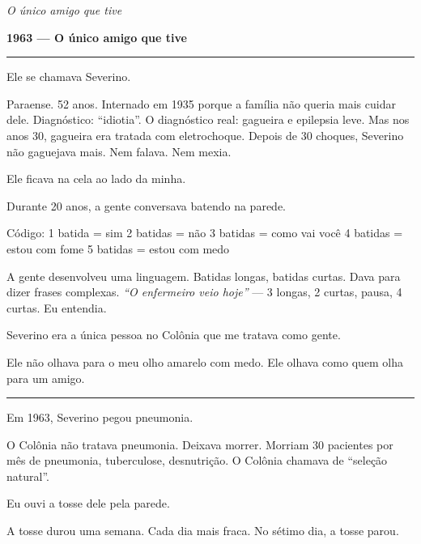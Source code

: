 
\noindent \textit{O único amigo que tive}

\noindent \textbf{1963 --- O único amigo que tive}

\vspace{0.5em}\noindent\rule{\textwidth}{0.5pt}\vspace{0.5em}

\noindent Ele se chamava Severino.

\noindent Paraense. 52 anos. Internado em 1935 porque a família não queria mais cuidar dele. Diagnóstico: \textquotedblleft{}idiotia\textquotedblright{}. O diagnóstico real: gagueira e epilepsia leve. Mas nos anos 30, gagueira era tratada com eletrochoque. Depois de 30 choques, Severino não gaguejava mais. Nem falava. Nem mexia.

\noindent Ele ficava na cela ao lado da minha.

\noindent Durante 20 anos, a gente conversava batendo na parede.

\noindent Código:
1 batida = sim
2 batidas = não
3 batidas = como vai você
4 batidas = estou com fome
5 batidas = estou com medo

\noindent A gente desenvolveu uma linguagem. Batidas longas, batidas curtas. Dava para dizer frases complexas. \textit{\textquotedblleft{}O enfermeiro veio hoje\textquotedblright{}} --- 3 longas, 2 curtas, pausa, 4 curtas. Eu entendia.

\noindent Severino era a única pessoa no Colônia que me tratava como gente.

\noindent Ele não olhava para o meu olho amarelo com medo. Ele olhava como quem olha para um amigo.

\vspace{0.5em}\noindent\rule{\textwidth}{0.5pt}\vspace{0.5em}

\noindent Em 1963, Severino pegou pneumonia.

\noindent O Colônia não tratava pneumonia. Deixava morrer. Morriam 30 pacientes por mês de pneumonia, tuberculose, desnutrição. O Colônia chamava de \textquotedblleft{}seleção natural\textquotedblright{}.

\noindent Eu ouvi a tosse dele pela parede.

\noindent A tosse durou uma semana. Cada dia mais fraca. No sétimo dia, a tosse parou.

